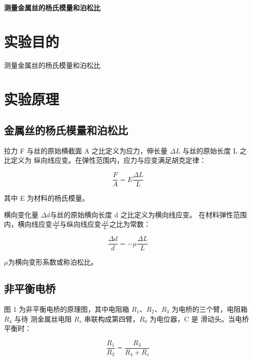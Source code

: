 \documentclass[a4paper,UTF8]{ctexart}
\begin{document}
\begin{center}
    \textbf{\Large 测量金属丝的杨氏模量和泊松比}
    \par {}
\end{center}

\section{实验目的}
测量金属丝的杨氏模量和泊松比
\section{实验原理}

\subsection{金属丝的杨氏模量和泊松比}
拉力 F 与丝的原始横截面 A 之比定义为应力，伸长量 $\Delta L$
与丝的原始长度 L 之比定义为
纵向线应变。在弹性范围内，应力与应变满足胡克定律：

\begin{equation}
    \frac{F}{A} = E \frac{\Delta L}{L}
\end{equation}

其中 E 为材料的杨氏模量。

横向变化量 $\Delta d$与丝的原始横向长度 d 之比定义为横向线应变。
在材料弹性范围内，横向线应变$\frac{\Delta d}{d}$与纵向线应变$\frac{\Delta L}{L}$之比为常数：

\begin{equation}
    \frac{\Delta d}{d} = -\mu \frac{\Delta L}{L}
\end{equation}

$\mu$为横向变形系数或称泊松比。

\subsection{非平衡电桥}

图 1 为非平衡电桥的原理图，其中电阻箱 $R_1$、$R_2$、$R_3$ 为电桥的三个臂，电阻箱 $R_4$ 与待
测金属丝电阻 $R_s$ 串联构成第四臂，$R_0$ 为电位器，C 是
滑动头。当电桥平衡时：

\begin{equation*}
    \frac{R_1}{R_2} = \frac{R_3}{R_4+R_s}
\end{equation*}
\end{document}
